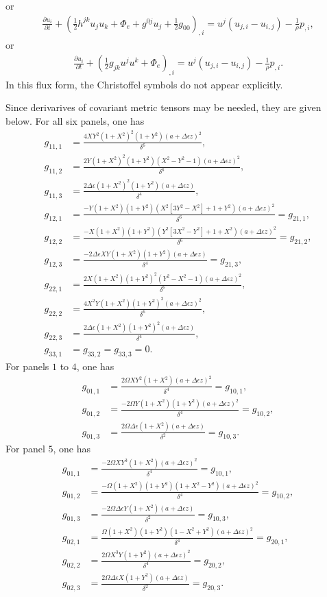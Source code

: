 \documentclass{article}
\begin{document}
or
\begin{align}
\frac{\partial u_i}{\partial t} + \left( \frac{1}{2} h^{jk}u_j u_k +\Phi_e + g^{0j}u_j+\frac{1}{2}g_{00}\right)_{,i} =u^j (u_{j,i} -u_{i,j} ) -\frac{1}{\rho} p_{,i},
\end{align}
or
\begin{align}
\frac{\partial u_i}{\partial t} + \left( \frac{1}{2} g_{jk}u^j u^k +\Phi_e \right)_{,i} =u^j (u_{j,i} -u_{i,j} ) -\frac{1}{\rho} p_{,i}.
\end{align}
In this flux form, the Christoffel symbols do not appear explicitly.

Since derivarives of covariant metric tensors may be needed, they are given below. For all six panels, one has
\begin{align}
g_{11,1}&=\frac{4XY^2(1+X^2)^2(1+Y^2)(a+\Delta \epsilon z)^2}{\delta^6}, \\
g_{11,2}&=\frac{2Y(1+X^2)^2(1+Y^2)(X^2-Y^2-1)(a+\Delta \epsilon z)^2}{\delta^6}, \\
g_{11,3}&=\frac{2\Delta \epsilon(1+X^2)^2(1+Y^2)(a+\Delta \epsilon z)}{\delta^4}, \\
g_{12,1}&=\frac{-Y(1+X^2)(1+Y^2)(X^2[3Y^2-X^2]+1+Y^2)(a+\Delta \epsilon z)^2}{\delta^6}=g_{21,1}, \\
g_{12,2}&=\frac{-X(1+X^2)(1+Y^2)(Y^2[3X^2-Y^2]+1+X^2)(a+\Delta \epsilon z)^2}{\delta^6}=g_{21,2}, \\
g_{12,3}&=\frac{-2\Delta \epsilon XY(1+X^2)(1+Y^2)(a+\Delta \epsilon z)}{\delta^4}=g_{21,3}, \\
g_{22,1}&=\frac{2X(1+X^2)(1+Y^2)^2(Y^2-X^2-1)(a+\Delta \epsilon z)^2}{\delta^6}, \\
g_{22,2}&=\frac{4X^2Y(1+X^2)(1+Y^2)^2(a+\Delta \epsilon z)^2}{\delta^6}, \\
g_{22,3}&=\frac{2\Delta \epsilon(1+X^2)(1+Y^2)^2(a+\Delta \epsilon z)}{\delta^4}, \\
g_{33,1}&=g_{33,2}=g_{33,3}=0.
\end{align}
For panels $1$ to $4$, one has
\begin{align}
g_{01,1}&=\frac{2\Omega XY^2(1+X^2)(a+\Delta \epsilon z)^2}{\delta^4}=g_{10,1}, \\
g_{01,2}&=\frac{-2\Omega Y(1+X^2)(1+Y^2)(a+\Delta \epsilon z)^2}{\delta^4}=g_{10,2}, \\
g_{01,3}&=\frac{2\Omega \Delta \epsilon (1+X^2)(a+\Delta \epsilon z)}{\delta^2}=g_{10,3}.
\end{align}
For panel $5$, one has
\begin{align}
g_{01,1}&=\frac{-2\Omega XY^3(1+X^2)(a+\Delta \epsilon z)^2}{\delta^4}=g_{10,1}, \\
g_{01,2}&=\frac{-\Omega (1+X^2)(1+Y^2)(1+X^2-Y^2)(a+\Delta \epsilon z)^2}{\delta^4}=g_{10,2}, \\
g_{01,3}&=\frac{-2\Omega \Delta \epsilon Y(1+X^2)(a+\Delta \epsilon z)}{\delta^2}=g_{10,3}, \\
g_{02,1}&=\frac{\Omega (1+X^2)(1+Y^2)(1-X^2+Y^2)(a+\Delta \epsilon z)^2}{\delta^4}=g_{20,1}, \\
g_{02,2}&=\frac{2\Omega X^3Y(1+Y^2)(a+\Delta \epsilon z)^2}{\delta^4}=g_{20,2}, \\
g_{02,3}&=\frac{2\Omega \Delta \epsilon X(1+Y^2)(a+\Delta \epsilon z)}{\delta^2}=g_{20,3}.
\end{align}
\end{document}
